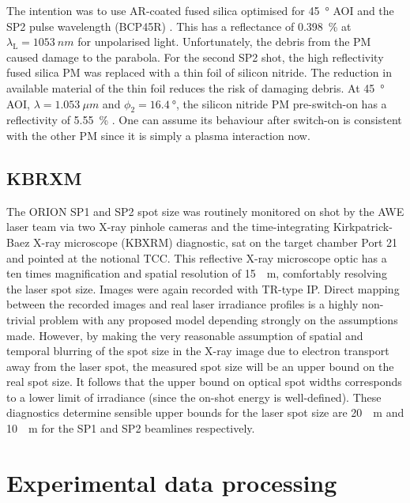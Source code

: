 The intention was to use \ac{AR}-coated fused silica optimised for \qty{45}{\degree} \ac{AOI} and the SP2 pulse wavelength (BCP45R) \cite{45AOIBeamsplitter}. This has a reflectance of \qty{0.398}{\%} at $\lambda_\mathrm{L} = \qty{1053}{nm}$ for unpolarised light. Unfortunately, the debris from the PM caused damage to the parabola. For the second SP2 shot, the high reflectivity fused silica PM was replaced with a thin foil of silicon nitride. The reduction in available material of the thin foil reduces the risk of damaging debris. At \qty{45}{\degree} \ac{AOI}, $\lambda = \qty{1.053}{\mu m}$ and $\phi_2 = \qty{16.4}{\degree}$, the silicon nitride PM pre-switch-on has a reflectivity of \qty{5.55}{\%} \cite{polyanskiyRefractiveindexInfoDatabase2024}. One can assume its behaviour after switch-on is consistent with the other PM since it is simply a plasma interaction now.

\subsection{KBRXM}
The ORION SP1 and SP2 spot size was routinely monitored on shot by the AWE laser team via two X-ray pinhole cameras and the time-integrating Kirkpatrick-Baez X-ray microscope (KBXRM) diagnostic, sat on the target chamber Port 21 and pointed at the notional \ac{TCC}. This reflective X-ray microscope optic has a ten times magnification and spatial resolution of \qty{15}{\mu m}, comfortably resolving the laser spot size. Images were again recorded with TR-type IP. Direct mapping between the recorded images and real laser irradiance profiles is a highly non-trivial problem with any proposed model depending strongly on the assumptions made. However, by making the very reasonable assumption of spatial and temporal blurring of the spot size in the X-ray image due to electron transport away from the laser spot, the measured spot size will be an upper bound on the real spot size. It follows that the upper bound on optical spot widths corresponds to a lower limit of irradiance (since the on-shot energy is well-defined). These diagnostics determine sensible upper bounds for the laser spot size are \qty{20}{\mu m} and \qty{10}{\mu m} for the SP1 and SP2 beamlines respectively.


\section{\label{ch:3-sec:data_processing}Experimental data processing}
